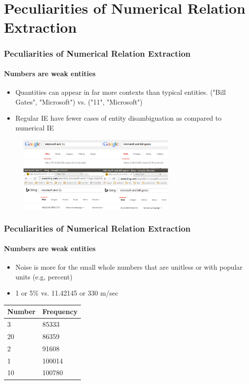 \documentclass{beamer}
\begin{document}
\section{Peculiarities of Numerical Relation Extraction}
\begin{frame}
\frametitle{Peculiarities of Numerical Relation Extraction}
\framesubtitle{Numbers are weak entities}
\begin{itemize}
\item Quantities can appear in far more contexts than typical entities. ("Bill Gates", "Microsoft") vs. ("11", "Microsoft")
\item Regular IE have fewer cases of entity disambiguation as compared to numerical IE
\end{itemize}

\begin{figure}
\includegraphics[width=0.7\textwidth]{images/popularitynumbers.eps}
\end{figure}

\end{frame}
    
\begin{frame}
\frametitle{Peculiarities of Numerical Relation Extraction}
\framesubtitle{Numbers are weak entities}
\begin{itemize}
 \item Noise is more for the small whole numbers that are unit\-less or with popular units (e.g, percent)
 \item 1 or 5\% vs. 11.42145 or 330 m/sec
\end{itemize}

\begin{center}
\begin{tabular}{l|l}
Number & Frequency\\ \hline
3 & 85333\\
20 & 86359\\
2 & 91608\\
1 & 100014\\
10 & 100780
\end{tabular}
\end{center}
\end{frame}
\end{document}
